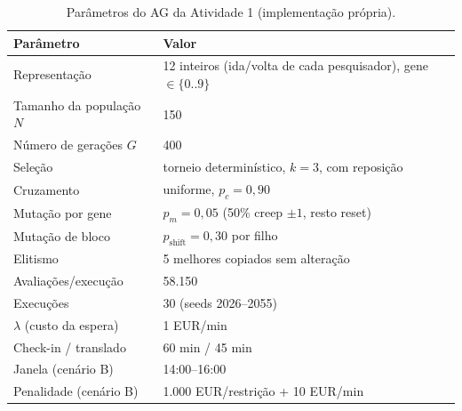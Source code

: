 \begin{table}[!t]
\centering
\footnotesize
\setlength{\tabcolsep}{4pt}
\caption{Parâmetros do AG da Atividade 1 (implementação própria).}
\label{tab:a1_params}
\begin{tabular}{@{}lp{4.6cm}@{}}
\toprule
Parâmetro & Valor \\
\midrule
Representação & 12 inteiros (ida/volta de cada pesquisador), gene $\in\{0..9\}$ \\
Tamanho da população $N$ & 150 \\
Número de gerações $G$ & 400 \\
Seleção & torneio determinístico, $k=3$, com reposição \\
Cruzamento & uniforme, $p_c=0{,}90$ \\
Mutação por gene & $p_m=0{,}05$ (50\% creep $\pm1$, resto reset) \\
Mutação de bloco & $p_{\mathrm{shift}}=0{,}30$ por filho \\
Elitismo & 5 melhores copiados sem alteração \\
Avaliações/execução & 58.150 \\
Execuções & 30 (seeds 2026--2055) \\
\midrule
$\lambda$ (custo da espera) & 1 EUR/min \\
Check-in / translado & 60 min / 45 min \\
Janela (cenário B) & 14:00--16:00 \\
Penalidade (cenário B) & 1.000 EUR/restrição + 10 EUR/min \\
\bottomrule
\end{tabular}
\end{table}
